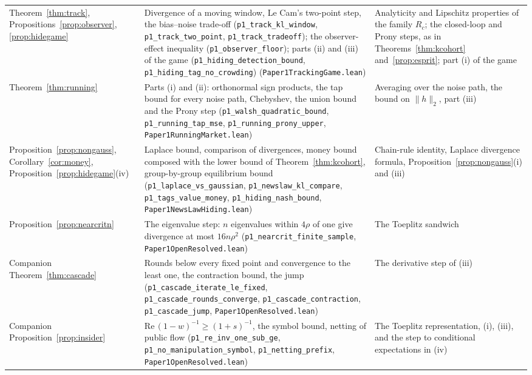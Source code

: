 \documentclass[12pt]{article}
\theoremstyle{definition}
\theoremstyle{remark}
\begin{document}
\begin{longtable}{>{\raggedright\arraybackslash}p{}>{\raggedright\arraybackslash}p{}>{\raggedright\arraybackslash}p{}}
Theorem~\ref{thm:track}, Propositions~\ref{prop:observer}, \ref{prop:hidegame} & Divergence of a moving window, Le Cam's two-point step, the bias--noise trade-off (\texttt{p1\_track\_kl\_window}, \texttt{p1\_track\_two\_point}, \texttt{p1\_track\_tradeoff}); the observer-effect inequality (\texttt{p1\_observer\_floor}); parts (ii) and (iii) of the game (\texttt{p1\_hiding\_detection\_bound}, \texttt{p1\_hiding\_tag\_no\_crowding}) (\nolinkurl{Paper1TrackingGame.lean}) & Analyticity and Lipschitz properties of the family $R_c$; the closed-loop and Prony steps, as in Theorems~\ref{thm:kcohort} and~\ref{prop:esprit}; part (i) of the game\\
Theorem~\ref{thm:running} & Parts (i) and (ii): orthonormal sign products, the tap bound for every noise path, Chebyshev, the union bound and the Prony step (\texttt{p1\_walsh\_quadratic\_bound}, \texttt{p1\_running\_tap\_mse}, \texttt{p1\_running\_prony\_upper}, \nolinkurl{Paper1RunningMarket.lean}) & Averaging over the noise path, the bound on $\|h\|_2$, part (iii)\\
Proposition~\ref{prop:nongauss}, Corollary~\ref{cor:money}, Proposition~\ref{prop:hidegame}(iv) & Laplace bound, comparison of divergences, money bound composed with the lower bound of Theorem~\ref{thm:kcohort}, group-by-group equilibrium bound (\texttt{p1\_laplace\_vs\_gaussian}, \texttt{p1\_newslaw\_kl\_compare}, \texttt{p1\_tags\_value\_money}, \texttt{p1\_hiding\_nash\_bound}, \nolinkurl{Paper1NewsLawHiding.lean}) & Chain-rule identity, Laplace divergence formula, Proposition~\ref{prop:nongauss}(i) and (iii)\\
Proposition~\ref{prop:nearcritn} & The eigenvalue step: $n$ eigenvalues within $4\rho$ of one give divergence at most $16n\rho^2$ (\texttt{p1\_nearcrit\_finite\_sample}, \nolinkurl{Paper1OpenResolved.lean}) & The Toeplitz sandwich\\
Companion Theorem~\ref{thm:cascade} & Rounds below every fixed point and convergence to the least one, the contraction bound, the jump (\texttt{p1\_cascade\_iterate\_le\_fixed}, \texttt{p1\_cascade\_rounds\_converge}, \texttt{p1\_cascade\_contraction}, \texttt{p1\_cascade\_jump}, \nolinkurl{Paper1OpenResolved.lean}) & The derivative step of (iii)\\
Companion Proposition~\ref{prop:insider} & $\mathrm{Re}\,(1-w)^{-1}\ge(1+s)^{-1}$, the symbol bound, netting of public flow (\texttt{p1\_re\_inv\_one\_sub\_ge}, \texttt{p1\_no\_manipulation\_symbol}, \texttt{p1\_netting\_prefix}, \nolinkurl{Paper1OpenResolved.lean}) & The Toeplitz representation, (i), (iii), and the step to conditional expectations in (iv)\\

\end{longtable}
\end{document}
